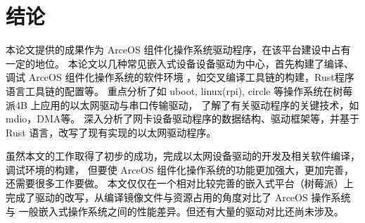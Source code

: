 \section{结论}

本论文提供的成果作为 ArceOS 组件化操作系统驱动程序，在该平台建设中占有一定的地位。
本论文以几种常见嵌入式设备设备驱动为中心，首先构建了编译、调试 ArceOS 组件化操作系统的软件环境
，如交叉编译工具链的构建，Rust程序语言工具链的配置等。
重点分析了如 uboot, linux(rpi), circle 等操作系统在树莓派4B 上应用的以太网驱动与串口传输驱动，
了解了有关驱动程序的关键技术，如mdio，DMA等。
深入分析了网卡设备驱动程序的数据结构、驱动框架等，并基于 Rust 语言，改写了现有实现的以太网驱动程序。

虽然本文的工作取得了初步的成功，完成以太网设备驱动的开发及相关软件编译，调试环境的构建，
但要使 ArceOS 组件化操作系统的功能更加强大，更加完善，还需要很多工作要做。
本文仅仅在一个相对比较完善的嵌入式平台（树莓派）上完成了驱动的改写，从编译镜像文件与资源占用的角度对比了 ArceOS 操作系统与
一般嵌入式操作系统之间的性能差异。但还有大量的驱动对比还尚未涉及。
